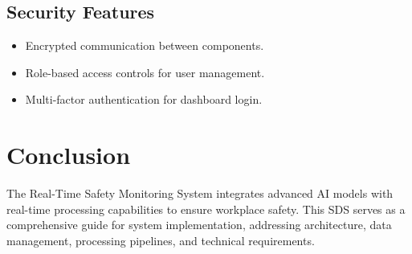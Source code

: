 \documentclass[12pt]{article}
\begin{document}
\subsection{Security Features}
\begin{itemize}
    \item Encrypted communication between components.
    \item Role-based access controls for user management.
    \item Multi-factor authentication for dashboard login.
\end{itemize}

\newpage
\section{Conclusion}
The Real-Time Safety Monitoring System integrates advanced AI models with real-time processing capabilities to ensure workplace safety. This SDS serves as a comprehensive guide for system implementation, addressing architecture, data management, processing pipelines, and technical requirements.
\end{document}
